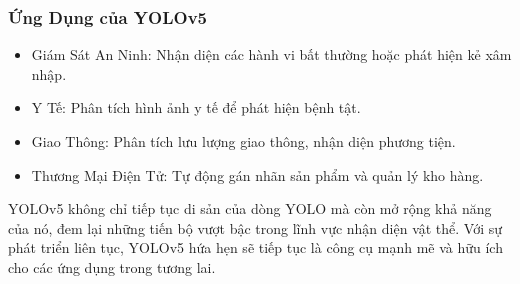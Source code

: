 \begin{flushleft}
    \subsubsection{Ứng Dụng của YOLOv5}
    \begin{itemize}
        \item Giám Sát An Ninh: Nhận diện các hành vi bất thường hoặc phát hiện kẻ xâm nhập.
        \item Y Tế: Phân tích hình ảnh y tế để phát hiện bệnh tật.
        \item Giao Thông: Phân tích lưu lượng giao thông, nhận diện phương tiện.
        \item Thương Mại Điện Tử: Tự động gán nhãn sản phẩm và quản lý kho hàng.
    \end{itemize}
    YOLOv5 không chỉ tiếp tục di sản của dòng YOLO mà còn mở rộng khả năng của nó, đem lại những tiến bộ vượt bậc trong lĩnh vực nhận diện vật thể. Với sự phát triển liên tục, YOLOv5 hứa hẹn sẽ tiếp tục là công cụ mạnh mẽ và hữu ích cho các ứng dụng trong tương lai.







\end{flushleft}
